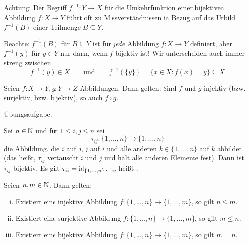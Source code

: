 Achtung: Der Begriff $f^{-1} \colon Y \rightarrow X$ für die Umkehrfunktion einer bijektiven Abbildung $f \colon X \rightarrow Y$ führt oft zu Missverständnissen in Bezug auf das Urbild $f^{-1}(B)$ einer Teilmenge $B \subseteq Y$.

Beachte: $f^{-1}(B)$ für $B \subseteq Y$ ist für \textit{jede} Abbildung $f \colon X \rightarrow Y$ definiert, aber $f^{-1}(y)$ für $y \in Y$ nur dann, wenn $f$ bijektiv ist!
Wir unterscheiden auch immer streng zwischen 
\[
	f^{-1}(y) \in X \qquad \text{und} \qquad f^{-1}(\{y\}) = \{x \in X : f(x) = y\} \subseteq X
\]

\begin{lemma}
	\label{lemma:I.2.14}
	Seien $f \colon X \rightarrow Y, g \colon Y \rightarrow Z$ Abbildungen.
	Dann gelten:
	Sind $f$ und $g$ injektiv (bzw. surjektiv, bzw. bijektiv), so auch $f \circ g$.
\end{lemma}

\begin{beweis}
	Übungsaufgabe.
\end{beweis}

\begin{beispiel}[Transpositionsabbildung]
	\label{bsp:I.2.15}
	Sei $n \in \mathbb{N}$ und für $1 \leq i,j \leq n$ sei
	\[
		\tau_{ij}\colon \{1,\dots,n\} \rightarrow \{1,\dots,n\}
	\]
	die Abbildung, die $i$ auf $j$, $j$ auf $i$ und alle anderen $k \in \{1,\dots,n\}$ auf $k$ abbildet (das heißt, $\tau_{ij}$ vertauscht $i$ und $j$ und hält alle anderen Elemente fest).
	Dann ist $\tau_{ij}$ bijektiv.
	Es gilt $\tau_{ii} = \operatorname{id}_{\{1,\dots,n\}}$.
	$\tau_{ij}$ heißt .
\end{beispiel}

\begin{lemma}
	\label{lemma:I.2.16}
	Seien $n,m \in \mathbb{N}$.
	Dann gelten:
	\begin{enumerate}[(i)]
		\item Existiert eine injektive Abbildung $f \colon \{1,\dots,n\} \rightarrow \{1,\dots,m\}$, so gilt $n \leq m$.
		\item Existiert eine surjektive Abbildung $f \colon \{1,\dots,n\} \rightarrow \{1,\dots,m\}$, so gilt $m \leq n$.
		\item Existiert eine bijektive Abbildung $f \colon \{1,\dots,n\} \rightarrow \{1,\dots,m\}$, so gilt $m = n$.
	\end{enumerate}
\end{lemma}

